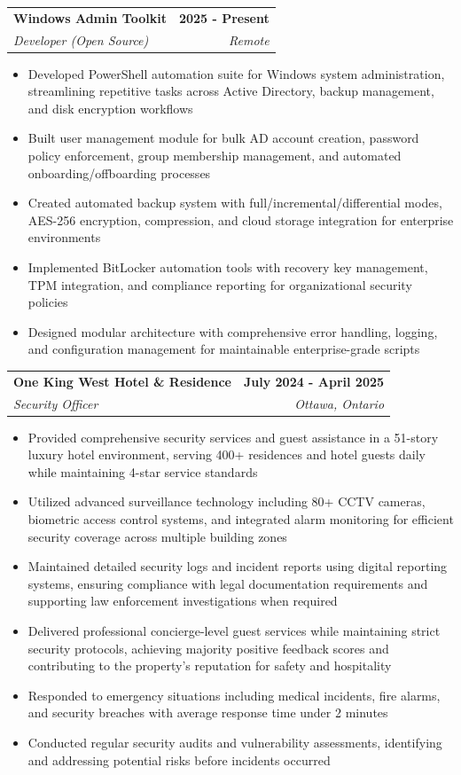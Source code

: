 \documentclass[letterpaper,11pt]{article}
\makeatletter
\newcommand{\resumeItem}[1]{
  \item\small{
    {#1 \vspace{-2pt}}
  }
}
\newcommand{\resumeSubheading}[4]{
  \vspace{-2pt}\item
    \begin{tabular*}{1.0\textwidth}[t]{l@{\extracolsep{\fill}}r}
      \textbf{#1} & \textbf{\small #2} \\
      \textit{\small#3} & \textit{\small #4} \\
    \end{tabular*}\vspace{-7pt}
}
\newcommand{\resumeItemListStart}{\begin{itemize}}
\newcommand{\resumeItemListEnd}{\end{itemize}\vspace{-5pt}}
\makeatother
\begin{document}
    \resumeSubheading
      {Windows Admin Toolkit}{2025 - Present}
      {Developer (Open Source)}{Remote}
      \resumeItemListStart
        \resumeItem{Developed PowerShell automation suite for Windows system administration, streamlining repetitive tasks across Active Directory, backup management, and disk encryption workflows}
        \resumeItem{Built user management module for bulk AD account creation, password policy enforcement, group membership management, and automated onboarding/offboarding processes}
        \resumeItem{Created automated backup system with full/incremental/differential modes, AES-256 encryption, compression, and cloud storage integration for enterprise environments}
        \resumeItem{Implemented BitLocker automation tools with recovery key management, TPM integration, and compliance reporting for organizational security policies}
        \resumeItem{Designed modular architecture with comprehensive error handling, logging, and configuration management for maintainable enterprise-grade scripts}
    \resumeItemListEnd

    \resumeSubheading
      {One King West Hotel \& Residence}{July 2024 - April 2025}
      {Security Officer}{Ottawa, Ontario}
      \resumeItemListStart
        \resumeItem{Provided comprehensive security services and guest assistance in a 51-story luxury hotel environment, serving 400+ residences and hotel guests daily while maintaining 4-star service standards}
        \resumeItem{Utilized advanced surveillance technology including 80+ CCTV cameras, biometric access control systems, and integrated alarm monitoring for efficient security coverage across multiple building zones}
        \resumeItem{Maintained detailed security logs and incident reports using digital reporting systems, ensuring compliance with legal documentation requirements and supporting law enforcement investigations when required}
        \resumeItem{Delivered professional concierge-level guest services while maintaining strict security protocols, achieving majority positive feedback scores and contributing to the property's reputation for safety and hospitality}
        \resumeItem{Responded to emergency situations including medical incidents, fire alarms, and security breaches with average response time under 2 minutes}
        \resumeItem{Conducted regular security audits and vulnerability assessments, identifying and addressing potential risks before incidents occurred}
    \resumeItemListEnd
\end{document}
